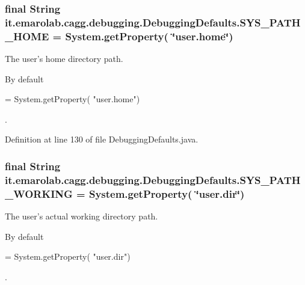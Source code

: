 \hypertarget{classit_1_1emarolab_1_1cagg_1_1debugging_1_1DebuggingDefaults_ae8b28f456d0e6190b071bf29fa2793d7}{
\subsubsection[{S\-Y\-S\-\_\-\-P\-A\-T\-H\-\_\-\-H\-O\-M\-E}]{\setlength{\rightskip}{0pt plus 5cm}final String it.\-emarolab.\-cagg.\-debugging.\-Debugging\-Defaults.\-S\-Y\-S\-\_\-\-P\-A\-T\-H\-\_\-\-H\-O\-M\-E = System.\-get\-Property( \char`\"{}user.\-home\char`\"{})\hspace{0.3cm}{\ttfamily [static]}}}\label{classit_1_1emarolab_1_1cagg_1_1debugging_1_1DebuggingDefaults_ae8b28f456d0e6190b071bf29fa2793d7}
The user's home directory path.\par
 By default
\begin{DoxyCode}
= System.getProperty( \textcolor{stringliteral}{"user.home"}) 
\end{DoxyCode}
 . 

Definition at line 130 of file Debugging\-Defaults.\-java.

\hypertarget{classit_1_1emarolab_1_1cagg_1_1debugging_1_1DebuggingDefaults_ac2710a46c5c4c629928170fa5e90095d}{
\subsubsection[{S\-Y\-S\-\_\-\-P\-A\-T\-H\-\_\-\-W\-O\-R\-K\-I\-N\-G}]{\setlength{\rightskip}{0pt plus 5cm}final String it.\-emarolab.\-cagg.\-debugging.\-Debugging\-Defaults.\-S\-Y\-S\-\_\-\-P\-A\-T\-H\-\_\-\-W\-O\-R\-K\-I\-N\-G = System.\-get\-Property( \char`\"{}user.\-dir\char`\"{})\hspace{0.3cm}{\ttfamily [static]}}}\label{classit_1_1emarolab_1_1cagg_1_1debugging_1_1DebuggingDefaults_ac2710a46c5c4c629928170fa5e90095d}
The user's actual working directory path.\par
 By default
\begin{DoxyCode}
= System.getProperty( \textcolor{stringliteral}{"user.dir"}) 
\end{DoxyCode}
 . 

